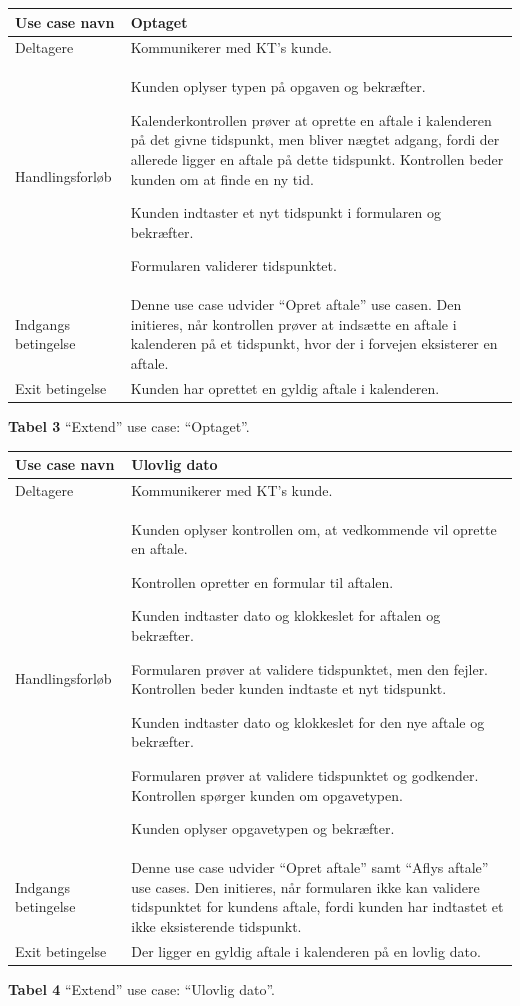\documentclass[12pt]{article}   %
\newcommand{\nextitem}{\par\hspace*{\labelsep}\textbullet\hspace*{\labelsep}}
\begin{document}
\begin{tabular}{l p{10cm}}
Use case navn & Optaget \\ \hline
Deltagere & \nextitem Kommunikerer med KT's kunde. 
            \\ \hline
Handlingsforløb &
	\nextitem Kunden oplyser typen på opgaven og bekræfter. 
	\nextitem Kalenderkontrollen prøver at oprette en aftale i kalenderen
	på det givne tidspunkt, men bliver nægtet adgang, fordi der allerede
	ligger en aftale på dette tidspunkt. Kontrollen beder kunden om at
	finde en ny tid.
	\nextitem Kunden indtaster et nyt tidspunkt i formularen og bekræfter. 
	\nextitem Formularen validerer tidspunktet.
	\\ \hline
	Indgangs betingelse &
		\nextitem Denne use case udvider ``Opret aftale'' use casen.
		Den initieres, når kontrollen prøver at indsætte en aftale i
		kalenderen på et tidspunkt, hvor der i forvejen eksisterer en
		aftale. 
		\\ \hline
Exit betingelse & Kunden har oprettet en gyldig aftale i kalenderen.
	\\ \hline
\end{tabular}
\begin{center}
\textbf{Tabel 3} ``Extend'' use case: ``Optaget''.       
\end{center}
\vspace{0.5cm}


\begin{tabular}{l p{10cm}}
Use case navn & Ulovlig dato \\ \hline
Deltagere & \nextitem Kommunikerer med KT's kunde.
            \\ \hline
Handlingsforløb &
	\nextitem Kunden oplyser kontrollen om, at vedkommende vil oprette en
	aftale.
	\nextitem Kontrollen opretter en formular til aftalen.
	\nextitem Kunden indtaster dato og klokkeslet for aftalen og
	bekræfter.
	\nextitem Formularen prøver at validere tidspunktet, men den fejler.
	Kontrollen beder kunden indtaste et nyt tidspunkt.
	\nextitem Kunden indtaster dato og klokkeslet for den nye aftale og
	bekræfter.
	\nextitem Formularen prøver at validere tidspunktet og godkender.
	Kontrollen spørger kunden om opgavetypen.
	\nextitem Kunden oplyser opgavetypen og bekræfter.
	\\ \hline
	Indgangs betingelse &
		\nextitem Denne use case udvider ``Opret aftale'' samt ``Aflys
		aftale'' use cases. Den initieres, når formularen ikke kan
		validere tidspunktet for kundens aftale, fordi kunden har
		indtastet et ikke eksisterende tidspunkt.  
		\\ \hline
Exit betingelse & Der ligger en gyldig aftale i kalenderen på en lovlig dato.
	\\ \hline
\end{tabular}
\begin{center}
\textbf{Tabel 4} ``Extend'' use case: ``Ulovlig dato''.       
\end{center}
\vspace{0.5cm}
\end{document}
